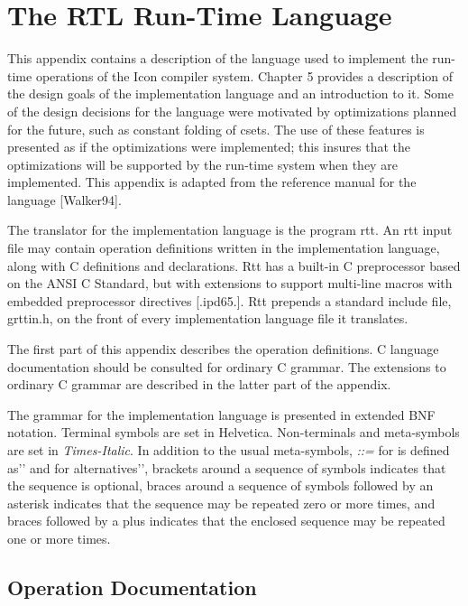 \chapter{The RTL Run-Time Language }

This appendix contains a description of the language used to implement
the run-time operations of the Icon compiler system. Chapter 5
provides a description of the design goals of the implementation
language and an introduction to it.  Some of the design decisions for
the language were motivated by optimizations planned for the future,
such as constant folding of csets. The use of these features is
presented as if the optimizations were implemented; this insures that
the optimizations will be supported by the run-time system when they
are implemented. This appendix is adapted from the reference manual
for the language [Walker94].

The translator for the implementation language is the program rtt. An
rtt input file may contain operation definitions written in the
implementation language, along with C definitions and
declarations. Rtt has a built-in C preprocessor based on the ANSI C
Standard, but with extensions to support multi-line macros with
embedded preprocessor directives [.ipd65.]. Rtt prepends a standard
include file, grttin.h, on the front of every implementation language
file it translates.

The first part of this appendix describes the operation definitions. C
language documentation should be consulted for ordinary C grammar. The
extensions to ordinary C grammar are described in the latter part of
the appendix.

The grammar for the implementation language is presented in extended
BNF notation. Terminal symbols are set in Helvetica. Non-terminals and
meta-symbols are set in \textit{Times-Italic}. In addition to the
usual meta-symbols, \textit{::=} for
{\textasciigrave}{\textasciigrave}is defined as'{}' and
\textit{{\textbar}} for
{\textasciigrave}{\textasciigrave}alternatives'{}', brackets around a
sequence of symbols indicates that the sequence is optional, braces
around a sequence of symbols followed by an asterisk indicates that
the sequence may be repeated zero or more times, and braces followed
by a plus indicates that the enclosed sequence may be repeated one or
more times.

\section{Operation Documentation }

